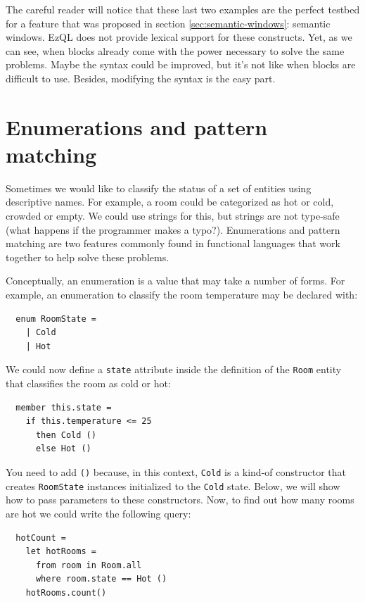 The careful reader will notice that these last two examples are the
perfect testbed for a feature that was proposed in section
\ref{sec:semantic-windows}: semantic windows. EzQL does not provide
lexical support for these constructs. Yet, as we can see, when blocks
already come with the power necessary to solve the same
problems. Maybe the syntax could be improved, but it's not like when
blocks are difficult to use. Besides, modifying the syntax is the easy
part.

\section{Enumerations and pattern matching}
\label{sec:enumerations}

Sometimes we would like to classify the status of a set of entities
using descriptive names. For example, a room could be categorized as
hot or cold, crowded or empty. We could use strings for this, but
strings are not type-safe (what happens if the programmer makes a
typo?). Enumerations and pattern matching are two features commonly
found in functional languages that work together to help solve these
problems.

Conceptually, an enumeration is a value that may take a number of
forms. For example, an enumeration to classify the room temperature
may be declared with:

\begin{lstlisting}
  enum RoomState =
    | Cold
    | Hot
\end{lstlisting}

We could now define a \verb=state= attribute inside the definition of
the \verb=Room= entity that classifies the room as cold or hot:

\begin{lstlisting}
  member this.state =
    if this.temperature <= 25
      then Cold ()
      else Hot ()
\end{lstlisting}

You need to add \verb=()= because, in this context, \verb=Cold= is a
kind-of constructor that creates \verb=RoomState= instances
initialized to the \verb=Cold= state. Below, we will show how to pass
parameters to these constructors. Now, to find out how many rooms are
hot we could write the following query:

\begin{lstlisting}
  hotCount =
    let hotRooms =
      from room in Room.all
      where room.state == Hot ()
    hotRooms.count()
\end{lstlisting}

